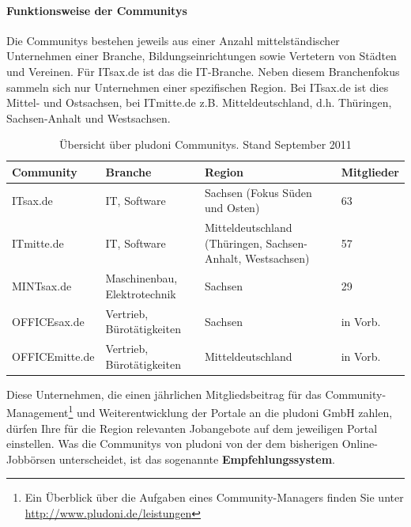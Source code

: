 \paragraph{Funktionsweise der Communitys}
Die Communitys bestehen jeweils aus einer Anzahl mittelständischer Unternehmen einer Branche, Bildungseinrichtungen sowie Vertetern von Städten und Vereinen. Für ITsax.de ist das die IT-Branche. Neben diesem Branchenfokus sammeln sich nur Unternehmen einer spezifischen Region. Bei ITsax.de ist dies Mittel- und Ostsachsen, bei ITmitte.de z.B. Mitteldeutschland, d.h. Thüringen, Sachsen-Anhalt und Westsachsen. 
\begin{table}[htbp]
\label{tb:dt}
\caption{Übersicht über pludoni Communitys. Stand September 2011}
\begin{tabular}{|l|p{2.8cm}|p{5cm}|l|}
\hline
\rowcolor{Gray}
Community & Branche & Region & Mitglieder \\\hline
ITsax.de & IT, Software &  Sachsen (Fokus Süden und Osten) & 63\\\hline
ITmitte.de & IT, Software &  Mitteldeutschland (Thüringen, Sachsen-Anhalt, Westsachsen) & 57 \\\hline
MINTsax.de & Maschinenbau, Elektrotechnik &  Sachsen & 29\\\hline
OFFICEsax.de & Vertrieb, Bürotätigkeiten &  Sachsen & in Vorb.\\\hline
OFFICEmitte.de & Vertrieb, Bürotätigkeiten &  Mitteldeutschland & in Vorb.\\\hline
\end{tabular}
\end{table}



Diese Unternehmen, die einen jährlichen Mitgliedsbeitrag für das Community\hyp{}Management\footnote{Ein Überblick über die Aufgaben eines Community-Managers finden Sie unter \url{http://www.pludoni.de/leistungen}} und Weiterentwicklung der Portale an die pludoni GmbH zahlen, dürfen Ihre für die Region relevanten Jobangebote auf dem jeweiligen Portal einstellen. Was die Communitys von pludoni von der dem bisherigen Online-Jobbörsen unterscheidet, ist das sogenannte \textbf{Empfehlungssystem}. 

